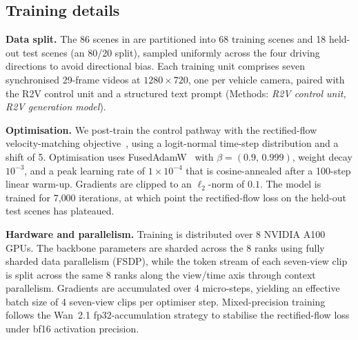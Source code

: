 \subsection*{Training details}\label{sec:training}

\textbf{Data split.}
The 86 scenes in \datasetname{} are partitioned into 68
training scenes and 18 held-out test scenes (an 80/20 split),
sampled uniformly across the four driving directions to avoid
directional bias. Each training unit comprises seven
synchronised 29-frame videos at $1280\!\times\!720$, one per
vehicle camera, paired with the R2V control unit and a
structured text prompt (Methods: \emph{R2V control unit,
R2V generation model}).

\textbf{Optimisation.}
We post-train the control pathway with the rectified-flow
velocity-matching
objective~\cite{liu2023rectifiedflow,agarwal2025cosmos},
using a logit-normal time-step distribution and a shift of 5.
Optimisation uses FusedAdamW~\cite{loshchilov2019adamw} with
$\beta\!=\!(0.9,\,0.999)$, weight decay $10^{-3}$, and a peak
learning rate of $1\!\times\!10^{-4}$ that is cosine-annealed
after a 100-step linear warm-up. Gradients are clipped to an
$\ell_2$-norm of $0.1$. The model is trained for 7{,}000
iterations, at which point the rectified-flow loss on the
held-out test scenes has plateaued.

\textbf{Hardware and parallelism.}
Training is distributed over 8 NVIDIA A100 GPUs. The backbone
parameters are sharded across the 8 ranks using fully sharded
data parallelism (FSDP), while the token stream of each
seven-view clip is split across the same 8 ranks along the
view/time axis through context parallelism. Gradients are
accumulated over 4 micro-steps, yielding an effective batch
size of 4 seven-view clips per optimiser step.
Mixed-precision training follows the Wan~2.1
fp32-accumulation strategy to stabilise the rectified-flow
loss under bf16 activation precision.
